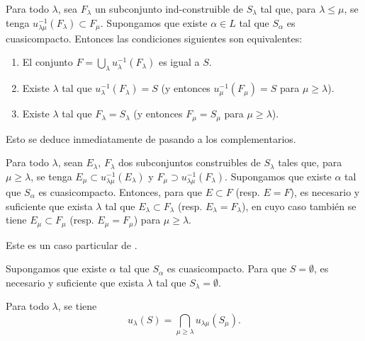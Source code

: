 \begin{corollary}[8.3.4]
\label{IV.8.3.4-fr}
Para todo $\lambda$, sea $F_\lambda$ un subconjunto ind-construible de $S_\lambda$ tal que, para $\lambda\leq\mu$, se tenga $u_{\lambda\mu}^{-1}(F_\lambda)\subset F_\mu$.
Supongamos que existe $\alpha\in L$ tal que $S_\alpha$ es cuasicompacto.
Entonces las condiciones siguientes son equivalentes:
\begin{enumerate}[label=\emph{\alph*)}]
   \item El conjunto $F=\bigcup_\lambda u_\lambda^{-1}(F_\lambda)$ es igual a $S$.
   \item Existe $\lambda$ tal que $u_\lambda^{-1}(F_\lambda)=S$ \textup{(y entonces $u_\mu^{-1}(F_\mu)=S$ para $\mu\geq\lambda$)}.
   \item Existe $\lambda$ tal que $F_\lambda=S_\lambda$ \textup{(y entonces $F_\mu=S_\mu$ para $\mu\geq\lambda$)}.
\end{enumerate}
Esto se deduce inmediatamente de  pasando a los complementarios.
\end{corollary}

\begin{corollary}[8.3.5]
\label{IV.8.3.5-fr}
Para todo $\lambda$, sean $E_\lambda$, $F_\lambda$ dos subconjuntos construibles de $S_\lambda$ tales que, para $\mu\geq\lambda$, se tenga $E_\mu\subset u_{\lambda\mu}^{-1}(E_\lambda)$ y $F_\mu\supset u_{\lambda\mu}^{-1}(F_\lambda)$.
Supongamos que existe $\alpha$ tal que $S_\alpha$ es cuasicompacto.
Entonces, para que $E\subset F$ \textup{(resp. $E=F$)}, es necesario y suficiente que exista $\lambda$ tal que $E_\lambda\subset F_\lambda$ \textup{(resp. $E_\lambda=F_\lambda$)}, en cuyo caso también se tiene $E_\mu\subset F_\mu$ \textup{(resp. $E_\mu=F_\mu$)} para $\mu\geq\lambda$.

Este es un caso particular de .
\end{corollary}

\begin{corollary}[8.3.6]
\label{IV.8.3.6-fr}
Supongamos que existe $\alpha$ tal que $S_\alpha$ es cuasicompacto.
Para que $S=\emptyset$, es necesario y suficiente que exista $\lambda$ tal que $S_\lambda=\emptyset$.
\end{corollary}

\begin{corollary}[8.3.7]
\label{IV.8.3.7-fr}
Para todo $\lambda$, se tiene
\begin{equation}
u_\lambda(S)=\bigcap_{\mu\geq\lambda}u_{\lambda\mu}(S_\mu).
\tag{8.3.7.1}\label{IV.8.3.7.1-fr}
\end{equation}
\end{corollary}

